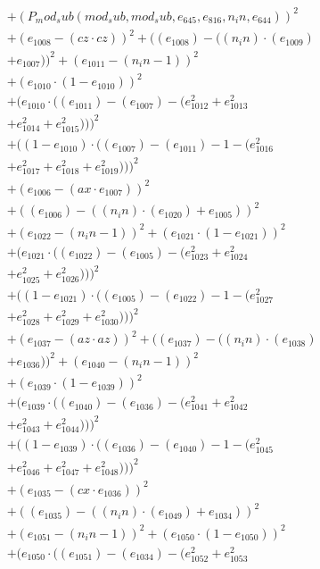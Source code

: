 \documentclass[10pt, a4paper]{article}
\begin{document}
\begin{align*}
& + (P_mod_sub(mod_sub, mod_sub, e_{645}, e_{816}, n_in, e_{644}))^{2} \\
& + (e_{1008} - (cz  \cdot  cz))^{2} + ((e_{1008}) - ((n_in)  \cdot  (e_{1009}) \\
& + e_{1007}))^{2} + (e_{1011} - (n_in - 1))^{2} \\
& + (e_{1010}  \cdot  (1 - e_{1010}))^{2} \\
& + (e_{1010}  \cdot  ((e_{1011}) - (e_{1007}) - (e_{1012}^{2} + e_{1013}^{2} \\
& + e_{1014}^{2} + e_{1015}^{2})))^{2} \\
& + ((1 - e_{1010})  \cdot  ((e_{1007}) - (e_{1011}) - 1 - (e_{1016}^{2} \\
& + e_{1017}^{2} + e_{1018}^{2} + e_{1019}^{2})))^{2} \\
& + (e_{1006} - (ax  \cdot  e_{1007}))^{2} \\
& + ((e_{1006}) - ((n_in)  \cdot  (e_{1020}) + e_{1005}))^{2} \\
& + (e_{1022} - (n_in - 1))^{2} + (e_{1021}  \cdot  (1 - e_{1021}))^{2} \\
& + (e_{1021}  \cdot  ((e_{1022}) - (e_{1005}) - (e_{1023}^{2} + e_{1024}^{2} \\
& + e_{1025}^{2} + e_{1026}^{2})))^{2} \\
& + ((1 - e_{1021})  \cdot  ((e_{1005}) - (e_{1022}) - 1 - (e_{1027}^{2} \\
& + e_{1028}^{2} + e_{1029}^{2} + e_{1030}^{2})))^{2} \\
& + (e_{1037} - (az  \cdot  az))^{2} + ((e_{1037}) - ((n_in)  \cdot  (e_{1038}) \\
& + e_{1036}))^{2} + (e_{1040} - (n_in - 1))^{2} \\
& + (e_{1039}  \cdot  (1 - e_{1039}))^{2} \\
& + (e_{1039}  \cdot  ((e_{1040}) - (e_{1036}) - (e_{1041}^{2} + e_{1042}^{2} \\
& + e_{1043}^{2} + e_{1044}^{2})))^{2} \\
& + ((1 - e_{1039})  \cdot  ((e_{1036}) - (e_{1040}) - 1 - (e_{1045}^{2} \\
& + e_{1046}^{2} + e_{1047}^{2} + e_{1048}^{2})))^{2} \\
& + (e_{1035} - (cx  \cdot  e_{1036}))^{2} \\
& + ((e_{1035}) - ((n_in)  \cdot  (e_{1049}) + e_{1034}))^{2} \\
& + (e_{1051} - (n_in - 1))^{2} + (e_{1050}  \cdot  (1 - e_{1050}))^{2} \\
& + (e_{1050}  \cdot  ((e_{1051}) - (e_{1034}) - (e_{1052}^{2} + e_{1053}^{2} \\

\end{align*}
\end{document}
